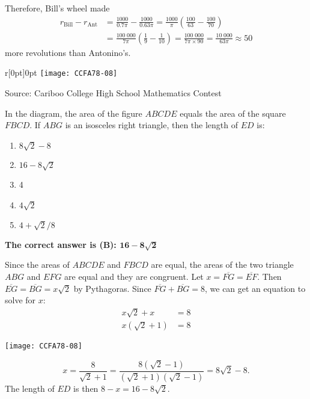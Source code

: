 \documentclass{article}
\begin{document}
Therefore, Bill's wheel made
\begin{align*}
r_{\text{Bill}} - r_{\text{Ant}} &= \frac{1000}{0.7\pi} - \frac{1000}{0.63\pi} = \frac{1000}{\pi} \left(\frac{100}{63}-\frac{100}{70}\right)\\
&= \frac{100\;000}{7\pi}\left(\frac{1}{9}-\frac{1}{10}\right) = \frac{100\;000}{7\pi \times 90} = \frac{10\;000}{63\pi} \approx 50
\end{align*}
more revolutions than Antonino's.

\vskip 1.5cm


\scriptsize
\begin{wrapfigure}[3]{r}[0pt]{0pt}
	\texttt{[image: CCFA78-08]}
\end{wrapfigure}
Source: Cariboo College High School Mathematics Contest

\normalsize
In the diagram, the area of the figure $ABCDE$ equals the area of the square $FBCD$. If $ABG$ is an isosceles right triangle, then the length of $ED$ is:
\begin{enumerate}[noitemsep,topsep=0mm,leftmargin=*,widest=D,label=\Alph*)]
	\item $8\sqrt{2}-8$
	\item $16-8\sqrt{2}$
	\item 4
	\item $4\sqrt{2}$
	\item $4+\sqrt{2}/8$
\end{enumerate}

\textbf{The correct answer is (B): $\mathbf{16-8\sqrt{2}}$}

\begin{minipage}[b]{0.6\textwidth}
Since the areas of $ABCDE$ and $FBCD$ are equal, the areas of the two triangle $ABG$ and $EFG$ are equal and they are congruent. Let $x=\overline{FG}=\overline{EF}$. Then $\overline{EG}=\overline{BG}=x\sqrt{2}$ by Pythagoras. Since $\overline{FG}+\overline{BG}=8$, we can get an equation to solve for $x$:
\begin{align*}
x\sqrt{2}+x &= 8\\
x(\sqrt{2}+1) &= 8
\end{align*}
\end{minipage}
\hfill
\begin{minipage}[t]{0.35\textwidth}
	\raggedleft
	\texttt{[image: CCFA78-08]}
\end{minipage}
\[x = \frac{8}{\sqrt{2}+1} = \frac{8(\sqrt{2}-1)}{(\sqrt{2}+1)(\sqrt{2}-1)} = 8\sqrt{2}-8.\]
The length of $ED$ is then $8-x=16-8\sqrt{2}$.
\end{document}

